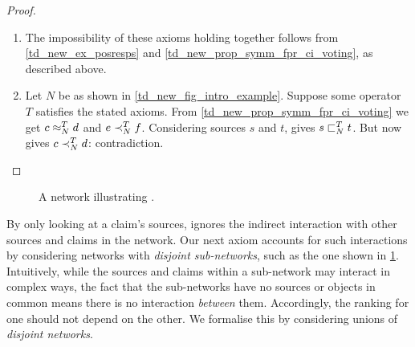 
\begin{proof}\leavevmode
    \begin{enumerate}
        \item The impossibility of these axioms holding together follows from
              \cref{td_new_ex_posresps} and
              \cref{td_new_prop_symm_fpr_ci_voting}, as described above.

          \item Let $N$ be as shown in \cref{td_new_fig_intro_example}. Suppose
                some operator $T$ satisfies the stated axioms. From
                \cref{td_new_prop_symm_fpr_ci_voting} we get $c \approx_N^T d$ and
                $e \prec_N^T f$. Considering sources $s$ and $t$,
                \sourcecoherence{} gives $s \sqsubset_N^T t$. But now
                \claimcoherence{} gives $c \prec_N^T d$: contradiction.
    \end{enumerate}
\end{proof}

\begin{figure}
    \centering
    \caption{
        A network illustrating \disjointindependence{}.
    }
    \label{td_new_fig_disjointindep_example}
\end{figure}

By only looking at a claim's sources, \classicalindependence{} ignores the
indirect interaction with other sources and claims in the network. Our next
axiom accounts for such interactions by considering networks with
\emph{disjoint sub-networks}, such as the one shown in
\cref{td_new_fig_disjointindep_example}. Intuitively, while the sources and
claims within a sub-network may interact in complex ways, the fact that the
sub-networks have no sources or objects in common means there is no interaction
\emph{between} them. Accordingly, the ranking for one should not depend on the
other. We formalise this by considering unions of \emph{disjoint
networks}.\footnotemark{}


